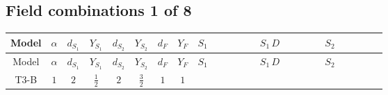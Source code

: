 \documentclass[8pt]{article}
\begin{document}
\begin{landscape}
\subsection*{Field combinations 1 of 8}
\begin{longtable}{@{}cccccccc >{\raggedright\arraybackslash}p{0.21\linewidth} >{\raggedright\arraybackslash}p{0.21\linewidth} >{\raggedright\arraybackslash}p{0.21\linewidth}@{}}
\toprule
Model & $\alpha$ & $d_{S_1}$ & $Y_{S_1}$ & $d_{S_2}$ & $Y_{S_2}$ & $d_F$ & $Y_F$ & $S_1$ & $S_1\,D$ & $S_2$ \\
\midrule
\endfirsthead
\toprule
Model & $\alpha$ & $d_{S_1}$ & $Y_{S_1}$ & $d_{S_2}$ & $Y_{S_2}$ & $d_F$ & $Y_F$ & $S_1$ & $S_1\,D$ & $S_2$ \\
\midrule
\endhead
T3-B & $1$ & $2$ & $\frac{1}{2}$ & $2$ & $\frac{3}{2}$ & $1$ & $1$ & \scriptsize\adjustbox{max width=\linewidth}{$\begin{gathered} -C_{S_1^\dagger S_1} S_{1,j_1} S_{1,j_1}{}^{\dagger } \\ +\frac{1}{2} C_{S_1^\dagger S_1} \hbar  \overline{y_{1,i_1,r_1}} S_{1,j_1} y_{1,i_1,r_1} S_{1,j_1}{}^{\dagger } \\ +\frac{C_{S_1^\dagger S_1} \hbar  \overline{y_{1,i_1,r_1}} S_{1,j_1} y_{1,i_1,r_1} S_{1,j_1}{}^{\dagger }}{\epsilon }\end{gathered}$} & \scriptsize\adjustbox{max width=\linewidth}{$\begin{gathered} +D_{\mu _1}\left(S_{1,j_1}\right){}^{\dagger } D_{\mu _1}\left(S_{1,j_1}\right)\end{gathered}$} & \scriptsize\adjustbox{max width=\linewidth}{$\begin{gathered} -C_{S_2^\dagger S_2} S_{2,j_1} S_{2,j_1}{}^{\dagger } \\ +\frac{1}{2} C_{S_2^\dagger S_2} \hbar  \overline{y_{2,i_1,r_1}} S_{2,j_1} y_{2,i_1,r_1} S_{2,j_1}{}^{\dagger } \\ +\frac{C_{S_2^\dagger S_2} \hbar  \overline{y_{2,i_1,r_1}} S_{2,j_1} y_{2,i_1,r_1} S_{2,j_1}{}^{\dagger }}{\epsilon }\end{gathered}$} \\

\end{longtable}
\end{landscape}
\end{document}
